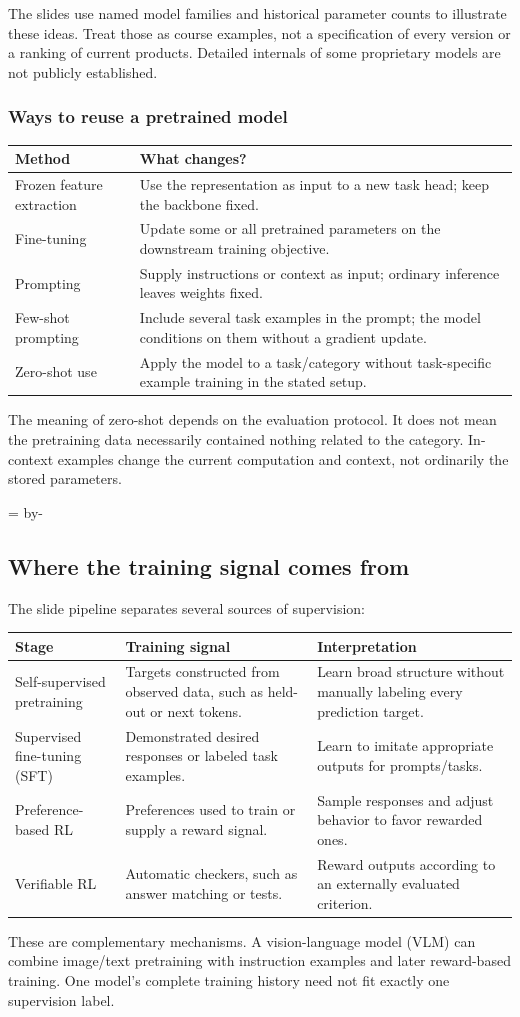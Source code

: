 \documentclass[11pt]{article}
\newcommand{\newsubsection}[1]{\par\begingroup\skip0=\pagegoal\advance\skip0 by-\pagetotal\ifdim\skip0<12\baselineskip\newpage\fi\endgroup\subsection{#1}}
\begin{document}
The slides use named model families and historical parameter counts to illustrate these ideas. Treat those as course examples, not a specification of every version or a ranking of current products. Detailed internals of some proprietary models are not publicly established.

\subsubsection{Ways to reuse a pretrained model}
\begin{longtable}{@{}P{.25\textwidth}P{.65\textwidth}@{}}
\toprule Method & What changes?\\\midrule\endhead
Frozen feature extraction & Use the representation as input to a new task head; keep the backbone fixed.\\
Fine-tuning & Update some or all pretrained parameters on the downstream training objective.\\
Prompting & Supply instructions or context as input; ordinary inference leaves weights fixed.\\
Few-shot prompting & Include several task examples in the prompt; the model conditions on them without a gradient update.\\
Zero-shot use & Apply the model to a task/category without task-specific example training in the stated setup.\\\bottomrule
\end{longtable}
The meaning of zero-shot depends on the evaluation protocol. It does not mean the pretraining data necessarily contained nothing related to the category. In-context examples change the current computation and context, not ordinarily the stored parameters.

\newsubsection{Where the training signal comes from}
The slide pipeline separates several sources of supervision:
\begin{longtable}{@{}P{.21\textwidth}P{.31\textwidth}P{.38\textwidth}@{}}
\toprule Stage & Training signal & Interpretation\\\midrule\endhead
Self-supervised pretraining & Targets constructed from observed data, such as held-out or next tokens. & Learn broad structure without manually labeling every prediction target.\\
Supervised fine-tuning (SFT) & Demonstrated desired responses or labeled task examples. & Learn to imitate appropriate outputs for prompts/tasks.\\
Preference-based RL & Preferences used to train or supply a reward signal. & Sample responses and adjust behavior to favor rewarded ones.\\
Verifiable RL & Automatic checkers, such as answer matching or tests. & Reward outputs according to an externally evaluated criterion.\\\bottomrule
\end{longtable}
These are complementary mechanisms. A vision-language model (VLM) can combine image/text pretraining with instruction examples and later reward-based training. One model's complete training history need not fit exactly one supervision label.
\end{document}
